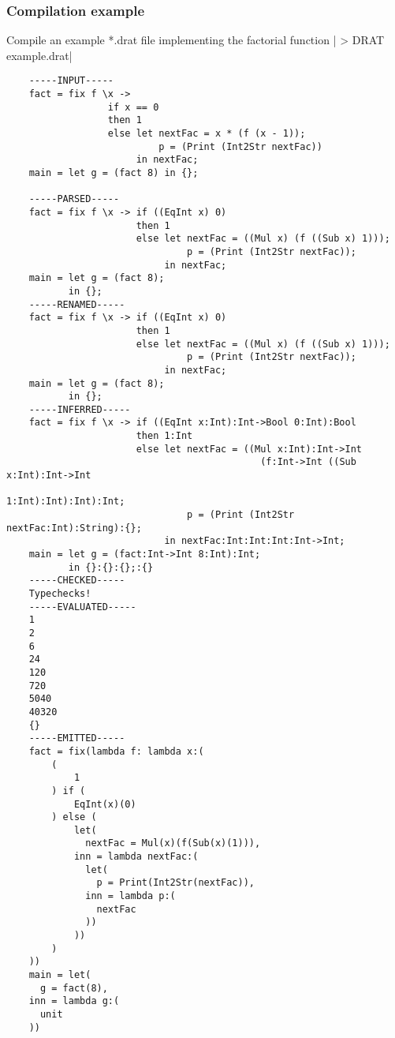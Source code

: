 \documentclass{article} %
\begin{document}
\subsubsection{Compilation example}
Compile an example *.drat file implementing the factorial function
|    > DRAT example.drat|
\begin{verbatim}
    -----INPUT-----
    fact = fix f \x ->
                  if x == 0
                  then 1
                  else let nextFac = x * (f (x - 1));
                           p = (Print (Int2Str nextFac))
                       in nextFac;
    main = let g = (fact 8) in {};
    
    -----PARSED-----
    fact = fix f \x -> if ((EqInt x) 0)
                       then 1
                       else let nextFac = ((Mul x) (f ((Sub x) 1)));
                                p = (Print (Int2Str nextFac));
                            in nextFac;
    main = let g = (fact 8);
           in {};
    -----RENAMED-----
    fact = fix f \x -> if ((EqInt x) 0)
                       then 1
                       else let nextFac = ((Mul x) (f ((Sub x) 1)));
                                p = (Print (Int2Str nextFac));
                            in nextFac;
    main = let g = (fact 8);
           in {};
    -----INFERRED-----
    fact = fix f \x -> if ((EqInt x:Int):Int->Bool 0:Int):Bool
                       then 1:Int
                       else let nextFac = ((Mul x:Int):Int->Int
                                             (f:Int->Int ((Sub x:Int):Int->Int
                                                            1:Int):Int):Int):Int;
                                p = (Print (Int2Str nextFac:Int):String):{};
                            in nextFac:Int:Int:Int:Int->Int;
    main = let g = (fact:Int->Int 8:Int):Int;
           in {}:{}:{};:{}
    -----CHECKED-----
    Typechecks!
    -----EVALUATED-----
    1
    2
    6
    24
    120
    720
    5040
    40320
    {}
    -----EMITTED-----
    fact = fix(lambda f: lambda x:(
        (
            1
        ) if (
            EqInt(x)(0)
        ) else (
            let(
              nextFac = Mul(x)(f(Sub(x)(1))),
            inn = lambda nextFac:(
              let(
                p = Print(Int2Str(nextFac)),
              inn = lambda p:(
                nextFac
              ))
            ))
        )
    ))
    main = let(
      g = fact(8),
    inn = lambda g:(
      unit
    ))
\end{verbatim}
\end{document}
